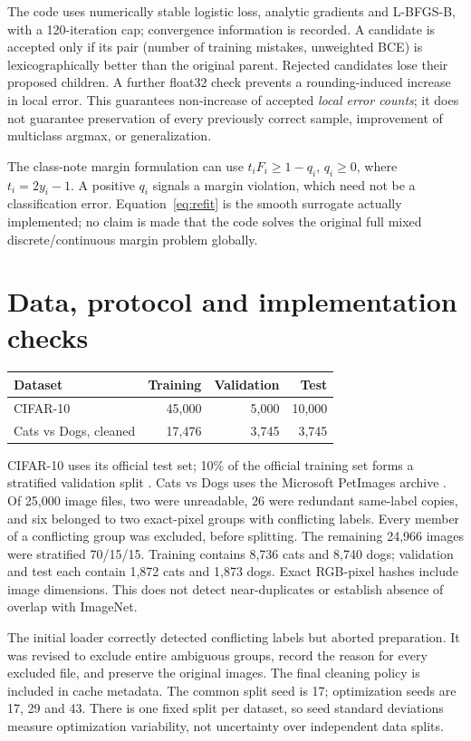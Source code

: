 \documentclass[11pt,a4paper]{article}
\begin{document}
The code uses numerically stable logistic loss, analytic gradients and L-BFGS-B, with a 120-iteration cap; convergence information is recorded. A candidate is accepted only if its pair (number of training mistakes, unweighted BCE) is lexicographically better than the original parent. Rejected candidates lose their proposed children. A further float32 check prevents a rounding-induced increase in local error. This guarantees non-increase of accepted \emph{local error counts}; it does not guarantee preservation of every previously correct sample, improvement of multiclass argmax, or generalization.

The class-note margin formulation can use $t_iF_i\geq1-q_i$, $q_i\geq0$, where $t_i=2y_i-1$. A positive $q_i$ signals a margin violation, which need not be a classification error. Equation~\eqref{eq:refit} is the smooth surrogate actually implemented; no claim is made that the code solves the original full mixed discrete/continuous margin problem globally.

\section{Data, protocol and implementation checks}\label{sec:protocol}
\begin{center}
\begin{tabular}{lrrr}\toprule
Dataset & Training & Validation & Test\\\midrule
CIFAR-10 & 45,000 & 5,000 & 10,000\\
Cats vs Dogs, cleaned & 17,476 & 3,745 & 3,745\\\bottomrule
\end{tabular}
\end{center}
CIFAR-10 uses its official test set; 10\% of the official training set forms a stratified validation split \cite{cifar}. Cats vs Dogs uses the Microsoft PetImages archive \cite{cats}. Of 25,000 image files, two were unreadable, 26 were redundant same-label copies, and six belonged to two exact-pixel groups with conflicting labels. Every member of a conflicting group was excluded, before splitting. The remaining 24,966 images were stratified 70/15/15. Training contains 8,736 cats and 8,740 dogs; validation and test each contain 1,872 cats and 1,873 dogs. Exact RGB-pixel hashes include image dimensions. This does not detect near-duplicates or establish absence of overlap with ImageNet.

The initial loader correctly detected conflicting labels but aborted preparation. It was revised to exclude entire ambiguous groups, record the reason for every excluded file, and preserve the original images. The final cleaning policy is included in cache metadata. The common split seed is 17; optimization seeds are 17, 29 and 43. There is one fixed split per dataset, so seed standard deviations measure optimization variability, not uncertainty over independent data splits.
\end{document}
